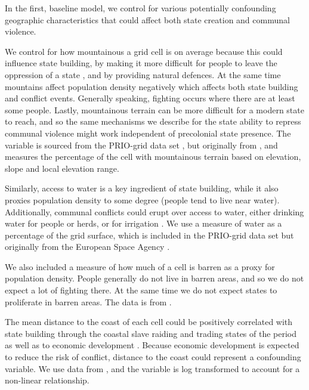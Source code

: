 In the first, baseline model, we control for various potentially confounding
geographic characteristics that could affect both state creation and communal
violence. 

We control for how mountainous a grid cell is on average because this could
influence state building, by making it more difficult for people to leave the
oppression of a state \citep{Carneiro1988, scott2017against}, and by providing
natural defences. At the same time mountains affect population density
negatively which affects both state building and conflict events. Generally
speaking, fighting occurs where there are at least some people. Lastly,
mountainous terrain can be more difficult for a modern state to reach, and so
the same mechanisms we describe for the state ability to repress communal
violence might work independent of precolonial state presence. The variable is
sourced from the PRIO-grid data set \citep{Tollefsen2012}, but originally from
\citet{Blyth2002}, and measures the percentage of the cell with mountainous
terrain based on elevation, slope and local elevation range.


Similarly, access to water is a key ingredient of state building, while it also
proxies population density to some degree (people tend to live near water).
Additionally, communal conflicts could erupt over access to water, either
drinking water for people or herds, or for irrigation \citep{Doring2020, Detges_2014}.
We use a measure of water as a percentage of the grid surface, which is included
in the PRIO-grid data set but originally from the European Space Agency
\citep{Bontemps2009}.

We also included a measure of how much of a cell is barren as a proxy for
population density. People generally do not live in barren areas, and so we do
not expect a lot of fighting there. At the same time we do not expect states to
proliferate in barren areas. The data is from \citet{Bontemps2009}.

The mean distance to the coast of each cell could be positively correlated with
state building through the coastal slave raiding and trading states of the
period as well as to economic development \citep{Nunn2008}. Because economic
development is expected to reduce the risk of conflict, distance to the coast
could represent a confounding variable. We use data from \citet{Wessel1996}, and
the variable is log transformed to account for a non-linear relationship.

